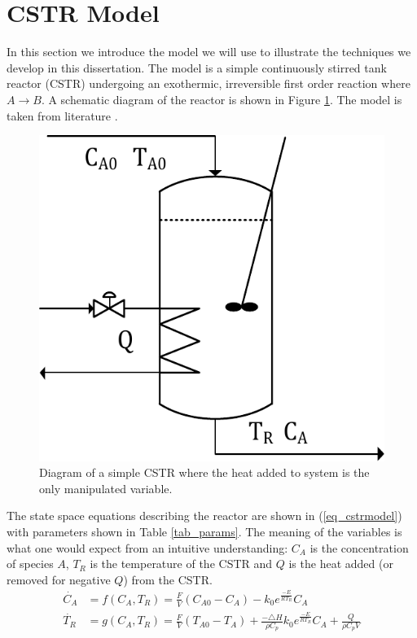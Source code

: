 \documentclass[../masters.tex]{subfiles}
\begin{document}
\graphicspath{{./imgs/}{../imgs/}} %

\section{CSTR Model}
In this section we introduce the model we will use to illustrate the techniques we develop in this dissertation. The model is a simple continuously stirred tank reactor (CSTR) undergoing an exothermic, irreversible first order reaction where $A \rightarrow B$. A schematic diagram of the reactor is shown in Figure \ref{fig_cstr_diagram}. The model is taken from literature \cite{cstrmodel}.
\begin{figure}[H] 
\centering
\includegraphics[scale=0.8]{cstr_diagram.pdf}
\caption{Diagram of a simple CSTR where the heat added to system is the only manipulated variable.}
\label{fig_cstr_diagram}
\end{figure}
The state space equations describing the reactor are shown in (\ref{eq_cstrmodel}) with parameters shown in Table \ref{tab_params}. The meaning of the variables is what one would expect from an intuitive understanding: $C_A$ is the concentration of species $A$, $T_R$ is the temperature of the CSTR and $Q$ is the heat added (or removed for negative $Q$) from the CSTR.
\begin{equation}
\begin{aligned}
\dot{C_A} &= f(C_A, T_R) =  \frac{F}{V}\left( C_{A0}-C_A \right) - k_0e^{\frac{-E}{RT_R}}C_A \\
\dot{T_R} &= g(C_A, T_R) = \frac{F}{V}\left(T_{A0}-T_A\right) + \frac{-\triangle H}{\rho C_p}k_0e^{\frac{-E}{RT_R}}C_A + \frac{Q}{\rho C_p V}
\end{aligned}
\label{eq_cstrmodel}
\end{equation}
\end{document}
